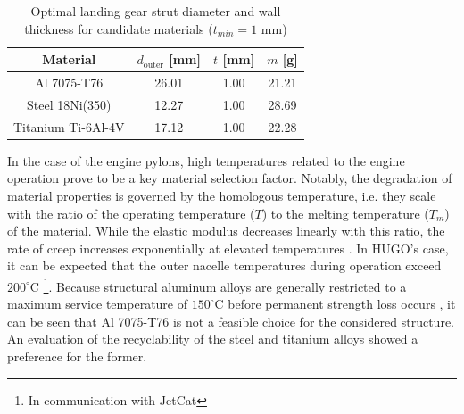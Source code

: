

\begin{table}[H]
    \centering
    \caption{Optimal landing gear strut diameter and wall thickness for candidate materials ($t_{min}=1$ mm)}
    \label{tab:strut_sizing}
    \begin{tabular}{|c|c|c|c|}
        \hline
        \textbf{Material} & \textbf{$d_\text{outer}$ [mm]} & \textbf{$t$ [mm]} & \textbf{$m$ [g]} \\\hline\hline
        Al 7075-T76 & 26.01 & 1.00 & 21.21 \\\hline
        Steel 18Ni(350) & 12.27 & 1.00 & 28.69 \\\hline
        Titanium Ti-6Al-4V & 17.12 & 1.00 & 22.28 \\\hline
    \end{tabular}
\end{table}

In the case of the engine pylons, high temperatures related to the engine operation prove to be a key material selection factor. Notably, the degradation of material properties is governed by the homologous temperature, i.e. they scale with the ratio of the operating temperature ($T$) to the melting temperature ($T_m$) of the material. While the elastic modulus decreases linearly with this ratio, the rate of creep increases exponentially at elevated temperatures \cite[p.224]{ashby2019materials}. In HUGO's case, it can be expected that the outer nacelle temperatures during operation exceed $200^\circ\text{C}$ \footnote{In communication with JetCat}. Because structural aluminum alloys are generally restricted to a maximum service temperature of $150^\circ\text{C}$ before permanent strength loss occurs \cite[p.242]{ashby2019materials}, it can be seen that Al 7075-T76 is not a feasible choice for the considered structure. An evaluation of the recyclability of the steel and titanium alloys showed a preference for the former.

